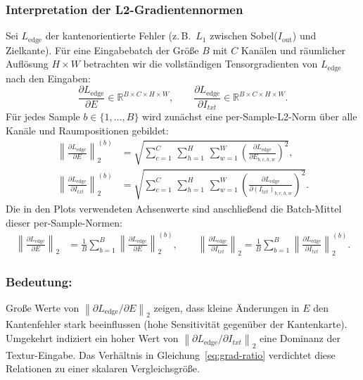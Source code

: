 \subsubsection{Interpretation der L2-Gradientennormen}%
Sei $L_{\mathrm{edge}}$ der kantenorientierte Fehler (z.\,B.\ $L_1$ zwischen Sobel($I_{\mathrm{out}}$) und Zielkante). Für eine Eingabebatch der Größe $B$ mit $C$ Kanälen und räumlicher Auflösung $H{\times}W$ betrachten wir die vollständigen Tensorgradienten von $L_{\mathrm{edge}}$ nach den Eingaben:
\[
\frac{\partial L_{\mathrm{edge}}}{\partial E} \in \mathbb{R}^{B \times C \times H \times W}, 
\qquad
\frac{\partial L_{\mathrm{edge}}}{\partial I_{txt}} \in \mathbb{R}^{B \times C \times H \times W}.
\]
Für jedes Sample $b\!\in\!\{1,\dots,B\}$ wird zunächst eine per-Sample-L2-Norm über alle Kanäle und Raumpositionen gebildet:
\begin{align}
    \left\lVert \tfrac{\partial L_{\mathrm{edge}}}{\partial E} \right\rVert_{2}^{(b)}
    &= \sqrt{\sum_{c=1}^{C}\,\sum_{h=1}^{H}\,\sum_{w=1}^{W} 
    \left(\tfrac{\partial L_{\mathrm{edge}}}{\partial E_{b,c,h,w}}\right)^{\!2}}, \label{eq:l2 per sample E}\\
    \left\lVert \tfrac{\partial L_{\mathrm{edge}}}{\partial I_{txt}} \right\rVert_{2}^{(b)}
    &= \sqrt{\sum_{c=1}^{C}\,\sum_{h=1}^{H}\,\sum_{w=1}^{W} 
    \left(\tfrac{\partial L_{\mathrm{edge}}}{\partial (I_{txt})_{b,c,h,w}}\right)^{\!2}}. \label{eq:l2 per sample I}
\end{align}
Die in den Plots verwendeten Achsenwerte sind anschließend die Batch-Mittel dieser per-Sample-Normen:
\begin{align}
    \left\lVert \tfrac{\partial L_{\mathrm{edge}}}{\partial E} \right\rVert_{2}
    &= \frac{1}{B}\sum_{b=1}^{B} \left\lVert \tfrac{\partial L_{\mathrm{edge}}}{\partial E} \right\rVert_{2}^{(b)}, 
    \qquad
    \left\lVert \tfrac{\partial L_{\mathrm{edge}}}{\partial I_{txt}} \right\rVert_{2}
    = \frac{1}{B}\sum_{b=1}^{B} \left\lVert \tfrac{\partial L_{\mathrm{edge}}}{\partial I_{txt}} \right\rVert_{2}^{(b)}.
\end{align}




\subsubsection{Bedeutung:} Große Werte von $\left\lVert \partial L_{\mathrm{edge}}/\partial E \right\rVert_{2}$ zeigen, dass kleine Änderungen in $E$ den Kantenfehler stark beeinflussen (hohe Sensitivität gegenüber der Kantenkarte). Umgekehrt indiziert ein hoher Wert von $\left\lVert \partial L_{\mathrm{edge}}/\partial I_{txt} \right\rVert_{2}$ eine Dominanz der Textur-Eingabe. Das Verhältnis in Gleichung~\eqref{eq:grad-ratio} verdichtet diese Relationen zu einer skalaren Vergleichsgröße.











